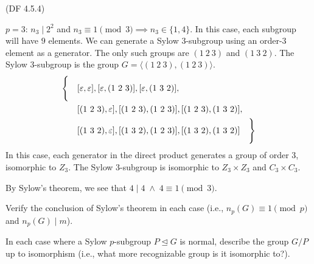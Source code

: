 \begin{problem}{(\textsf{DF 4.5.4})}
\begin{enumalph}
\begin{Answer}
\begin{enumalph}
\begin{enumalph}
              \bigskip
              \item $p=3$:
                $n_3 \mid 2^2$ and $n_3 \equiv 1 \pmod 3 \implies n_3 \in \{1, 4\}$.
                In this case, each subgroup will have $9$ elements.
                We can generate a Sylow $3$-subgroup using an order-$3$
                element as a generator. The only such groups are $(1\ 2\ 3)$ and $(1\ 3\ 2)$.
                The Sylow $3$-subgroup is the group $G = \langle (1\ 2\ 3), (1\ 2\ 3) \rangle$.
                \begin{align*}
                  \Biggl\{\quad
                      &[\varepsilon, \varepsilon],
                      [\varepsilon, (1\ 2\ 3)],
                      [\varepsilon, (1\ 3\ 2)],\\
                      &[(1\ 2\ 3), \varepsilon],
                      [(1\ 2\ 3), (1\ 2\ 3)],
                      [(1\ 2\ 3), (1\ 3\ 2)],\\
                      &[(1\ 3\ 2), \varepsilon],
                      [(1\ 3\ 2), (1\ 2\ 3)],
                      [(1\ 3\ 2), (1\ 3\ 2)]
                  \quad \Biggl\}
              \end{align*}
              In this case, each generator in the direct product
              generates a group of order $3$, isomorphic to $Z_3$.
              The Sylow $3$-subgroup is isomorphic
              to $Z_3 \times Z_3$ and $C_3 \times C_3$.

              \noindent
              By Sylow's theorem, we see that $4 \mid 4 \; \land \; 4 \equiv 1 \pmod 3$.
            \end{enumalph}
      \end{enumalph}
    \end{Answer}
    \item Verify the conclusion of Sylow's theorem in each case (i.e., $n_p(G) \equiv 1
    \pmod{p}$ and $n_p(G) \mid m$).
    \begin{Answer}
    \end{Answer}
    \item In each case where a Sylow $p$-subgroup $P \trianglelefteq G$ is normal, 
    describe the group $G/P$ up to isomorphism (i.e., what more recognizable group is 
    it isomorphic to?).
    \begin{Answer}
    \end{Answer}
    \end{enumalph}
\end{problem}
